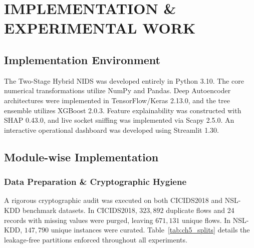 \documentclass[12pt,a4paper]{report}
\begin{document}
\clearpage
\chapter{IMPLEMENTATION \& EXPERIMENTAL WORK}\label{ch:implementation}

\section{Implementation Environment}
The Two-Stage Hybrid NIDS was developed entirely in Python 3.10. The core numerical transformations utilize NumPy and Pandas. Deep Autoencoder architectures were implemented in TensorFlow/Keras 2.13.0, and the tree ensemble utilizes XGBoost 2.0.3. Feature explainability was constructed with SHAP 0.43.0, and live socket sniffing was implemented via Scapy 2.5.0. An interactive operational dashboard was developed using Streamlit 1.30.

\section{Module-wise Implementation}

\subsection{Data Preparation \& Cryptographic Hygiene}
A rigorous cryptographic audit was executed on both CICIDS2018 and NSL-KDD benchmark datasets. In CICIDS2018, $323{,}892$ duplicate flows and 24 records with missing values were purged, leaving $671{,}131$ unique flows. In NSL-KDD, $147{,}790$ unique instances were curated. Table~\ref{tab:ch5_splits} details the leakage-free partitions enforced throughout all experiments.
\end{document}

